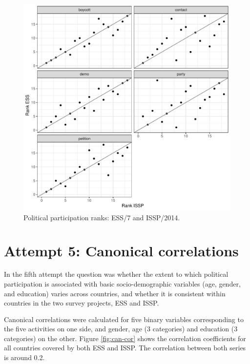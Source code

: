 \documentclass[12pt,]{article}
\begin{document}
\begin{figure}[H]

{\centering \includegraphics{report_files/figure-latex/cntry-ranks-1} 

}

\caption{Political participation ranks: ESS/7 and ISSP/2014.}\label{fig:cntry-ranks}
\end{figure}

\hypertarget{attempt-5-canonical-correlations}{%
\section{Attempt 5: Canonical correlations}\label{attempt-5-canonical-correlations}}

In the fifth attempt the question was whether the extent to which political participation is associated with basic socio-demographic variables (age, gender, and education) varies across countries, and whether it is consistent within countries in the two survey projects, ESS and ISSP.

Canonical correlations were calculated for five binary variables corresponding to the five activities on one side, and gender, age (3 categories) and education (3 categories) on the other. Figure \ref{fig:can-cor} shows the correlation coefficients for all countries covered by both ESS and ISSP. The correlation between both series is around 0.2.
\end{document}
